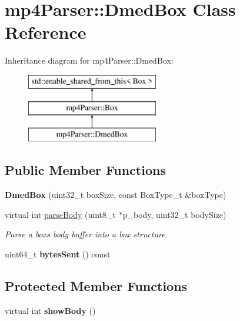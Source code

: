 \hypertarget{classmp4_parser_1_1_dmed_box}{}\section{mp4\+Parser\+::Dmed\+Box Class Reference}
\label{classmp4_parser_1_1_dmed_box}
Inheritance diagram for mp4\+Parser\+::Dmed\+Box\+:\begin{figure}[H]
\begin{center}
\leavevmode
\includegraphics[height=3.000000cm]{classmp4_parser_1_1_dmed_box}
\end{center}
\end{figure}
\subsection*{Public Member Functions}
\begin{DoxyCompactItemize}
\item 
\mbox{\label{classmp4_parser_1_1_dmed_box_a62fa22a41536e8ec7fe0f6e4e8c694e9}} 
{\bfseries Dmed\+Box} (uint32\+\_\+t box\+Size, const Box\+Type\+\_\+t \&box\+Type)
\item 
virtual int \mbox{\hyperlink{classmp4_parser_1_1_dmed_box_a34c87ade60a56d01a0b809aa067e955c}{parse\+Body}} (uint8\+\_\+t $\ast$p\+\_\+body, uint32\+\_\+t body\+Size)
\begin{DoxyCompactList}\small\item\em Parse a box\textquotesingle{}s body buffer into a box structure. \end{DoxyCompactList}\item 
\mbox{\label{classmp4_parser_1_1_dmed_box_a763fc27516e3131a85df3745c96de657}} 
uint64\+\_\+t {\bfseries bytes\+Sent} () const
\end{DoxyCompactItemize}
\subsection*{Protected Member Functions}
\begin{DoxyCompactItemize}
\item 
\mbox{\label{classmp4_parser_1_1_dmed_box_a9aa28ee387a58f49a70502cd09937f44}} 
virtual int {\bfseries show\+Body} ()
\end{DoxyCompactItemize}

